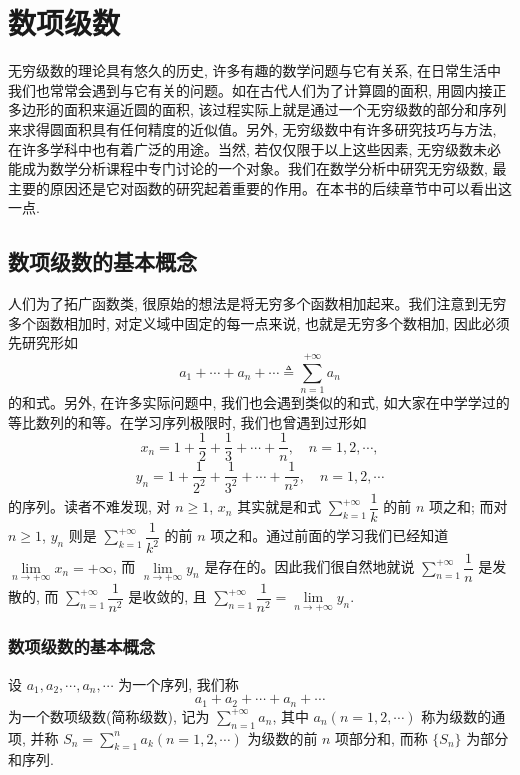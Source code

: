 \setcounter{chapter}{8} %
\chapter{数项级数}
\label{chap:ma-9}

无穷级数的理论具有悠久的历史, 许多有趣的数学问题与它有关系, 在日常生活中我们也常常会遇到与它有关的问题。如在古代人们为了计算圆的面积, 用圆内接正多边形的面积来逼近圆的面积, 该过程实际上就是通过一个无穷级数的部分和序列来求得圆面积具有任何精度的近似值。另外, 无穷级数中有许多研究技巧与方法, 在许多学科中也有着广泛的用途。当然, 若仅仅限于以上这些因素, 无穷级数未必能成为数学分析课程中专门讨论的一个对象。我们在数学分析中研究无穷级数, 最主要的原因还是它对函数的研究起着重要的作用。在本书的后续章节中可以看出这一点.

\section{数项级数的基本概念}
\label{sec:ma-9-1}

人们为了拓广函数类, 很原始的想法是将无穷多个函数相加起来。我们注意到无穷多个函数相加时, 对定义域中固定的每一点来说, 也就是无穷多个数相加, 因此必须先研究形如
\begin{equation}
  a_1+\cdots+a_n+\cdots\triangleq \sum_{n=1}^{+\infty}a_n
  \label{eq:ma-9-1-1}
\end{equation}
的和式。另外, 在许多实际问题中, 我们也会遇到类似的和式, 如大家在中学学过的等比数列的和等。在学习序列极限时, 我们也曾遇到过形如
\[
  x_n=1+\frac12+\frac13+\cdots+\frac1n,\quad n=1,2,\cdots,
\]
\[
  y_n=1+\frac1{2^2}+\frac1{3^2}+\cdots+\frac1{n^2},\quad n=1,2,\cdots
\]
的序列。读者不难发现, 对 $n\geq1$, $x_n$ 其实就是和式 $\sum\limits_{k=1}^{+\infty}\dfrac1k$ 的前 $n$ 项之和; 而对 $n\geq1$, $y_n$ 则是 $\sum\limits_{k=1}^{+\infty}\dfrac1{k^2}$ 的前 $n$ 项之和。通过前面的学习我们已经知道 $\lim\limits_{n\to+\infty}x_n=+\infty$, 而 $\lim\limits_{n\to+\infty}y_n$ 是存在的。因此我们很自然地就说 $\sum\limits_{n=1}^{+\infty}\dfrac1n$ 是发散的, 而 $\sum\limits_{n=1}^{+\infty}\dfrac1{n^2}$ 是收敛的, 且 $\sum\limits_{n=1}^{+\infty}\dfrac1{n^2}=\lim\limits_{n\to+\infty}y_n$.

\subsection{数项级数的基本概念}
\label{subsec:ma-9-1-1}

设 $a_1,a_2,\cdots,a_n,\cdots$ 为一个序列, 我们称
\[
  a_1+a_2+\cdots+a_n+\cdots
\]
为一个数项级数(简称级数), 记为 $\sum\limits_{n=1}^{+\infty}a_n$, 其中 $a_n(n=1,2,\cdots)$ 称为级数的通项, 并称 $S_n=\sum\limits_{k=1}^n a_k(n=1,2,\cdots)$ 为级数的前 $n$ 项部分和, 而称 $\{S_n\}$ 为部分和序列.

